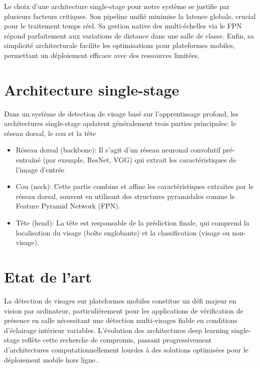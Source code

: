 \begin{onehalfspace}
\hspace{0.65cm} Le choix d'une architecture single-stage pour notre système se justifie par plusieurs facteurs critiques. Son pipeline unifié minimise la latence globale, crucial pour le traitement temps réel. Sa gestion native des multi-échelles via le FPN répond parfaitement aux variations de distance dans une salle de classe. Enfin, sa simplicité architecturale facilite les optimisations pour plateformes mobiles, permettant un déploiement efficace avec des ressources limitées.

\section{Architecture single-stage}
 Dans un système de detection de visage basé sur l'apprentissage profond, les architectures single-stage apdatent généralement  trois parties principales: le réseau dorsal, le cou et la tête \cite{186Текстстатті46511020230930}
\begin{itemize}
     \item Réseau dorsal (backbone): Il s'agit d'un réseau neuronal convolutif pré-entraîné (par exemple, ResNet, VGG) qui extrait les caractéristiques de l'image d'entrée
     \item Cou (neck): Cette partie combine et affine les caractéristiques extraites par le réseau dorsal, souvent en utilisant des structures pyramidales comme le Feature Pyramid Network (FPN).
     \item Tête (head): La tête est responsable de la prédiction finale, qui comprend la localisation du visage (boîte englobante) et la classification (visage ou non-visage).

\end{itemize}

\section{Etat de l'art}

\hspace{0.65cm} La détection de visages sur plateformes mobiles constitue un défi majeur en vision par ordinateur, particulièrement pour les applications de vérification de présence en salle nécessitant une détection multi-visages fiable en conditions d'éclairage intérieur variables. L'évolution des architectures deep learning single-stage reflète cette recherche de compromis, passant progressivement d'architectures computationnellement lourdes à des solutions optimisées pour le déploiement mobile hors ligne..


\end{onehalfspace}
